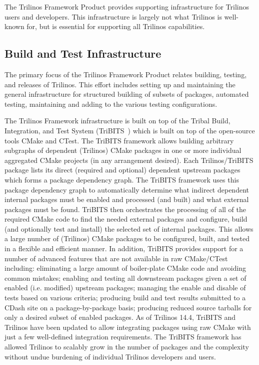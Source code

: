 

The Trilinos Framework Product provides supporting infrastructure for Trilinos users and developers. This infrastructure is largely not what Trilinos is well-known for, but is essential for supporting all Trilinos capabilities.

\subsection{Build and Test Infrastructure}

The primary focus of the Trilinos Framework Product relates building, testing, and releases of Trilinos. This effort includes setting up and maintaining the general infrastructure for structured building of subsets of packages, automated testing, maintaining and adding to the various testing configurations.

The Trilinos Framework infrastructure is built on top of the Tribal Build, Integration, and Test System (TriBITS~\cite{Bartlett2014}) which is built on top of the open-source tools CMake and CTest.
The TriBITS framework allows building arbitrary subgraphs of dependent (Trilinos) CMake packages in one or more individual aggregated CMake projects (in any arrangement desired).
Each Trilinos/TriBITS package lists its direct (required and optional) dependent upstream packages which forms a package dependency graph.
The TriBITS framework uses this package dependency graph to automatically determine what indirect dependent internal packages must be enabled and processed (and built) and what external packages must be found.
TriBITS then orchestrates the processing of all of the required CMake code to find the needed external packages and configure, build (and optionally test and install) the selected set of internal packages.
This allows a large number of (Trilinos) CMake packages to be configured, built, and tested in a flexible and efficient manner.
In addition, TriBITS provides support for a number of advanced features that are not available in raw CMake/CTest including: eliminating a large amount of boiler-plate CMake code and avoiding common mistakes; enabling and testing all downstream packages given a set of enabled (i.e. modified) upstream packages; managing the enable and disable of tests based on various criteria; producing build and test results submitted to a CDash site on a package-by-package basis; producing reduced source tarballs for only a desired subset of enabled packages.
As of Trilinos 14.4, TriBITS and Trilinos have been updated to allow integrating packages using raw CMake with just a few well-defined integration requirements.
The TriBITS framework has allowed Trilinos to scalably grow in the number of packages and the complexity without undue burdening of individual Trilinos developers and users.


